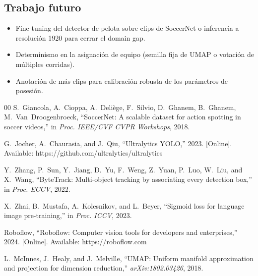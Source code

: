 \documentclass[conference]{IEEEtran}
\begin{document}
\subsection{Trabajo futuro}

\begin{itemize}
    \item Fine-tuning del detector de pelota sobre clips de SoccerNet o
    inferencia a resolución 1920 para cerrar el domain gap.
    \item Determinismo en la asignación de equipo (semilla fija de UMAP o
    votación de múltiples corridas).
    \item Anotación de más clips para calibración robusta de los parámetros
    de posesión.
\end{itemize}

\begin{thebibliography}{00}
 S.~Giancola, A.~Cioppa, A.~Deliège, F.~Silvio,
D.~Ghanem, B.~Ghanem, M.~Van~Droogenbroeck, ``SoccerNet: A scalable
dataset for action spotting in soccer videos,'' in \emph{Proc. IEEE/CVF
CVPR Workshops}, 2018.

 G.~Jocher, A.~Chaurasia, and J.~Qiu, ``Ultralytics
YOLO,'' 2023. [Online]. Available: https://github.com/ultralytics/ultralytics

 Y.~Zhang, P.~Sun, Y.~Jiang, D.~Yu, F.~Weng, Z.~Yuan,
P.~Luo, W.~Liu, and X.~Wang, ``ByteTrack: Multi-object tracking by
associating every detection box,'' in \emph{Proc. ECCV}, 2022.

 X.~Zhai, B.~Mustafa, A.~Kolesnikov, and L.~Beyer,
``Sigmoid loss for language image pre-training,'' in \emph{Proc. ICCV},
2023.

 Roboflow, ``Roboflow: Computer vision tools for
developers and enterprises,'' 2024. [Online]. Available:
https://roboflow.com

 L.~McInnes, J.~Healy, and J.~Melville, ``UMAP: Uniform
manifold approximation and projection for dimension reduction,''
\emph{arXiv:1802.03426}, 2018.
\end{thebibliography}
\end{document}
